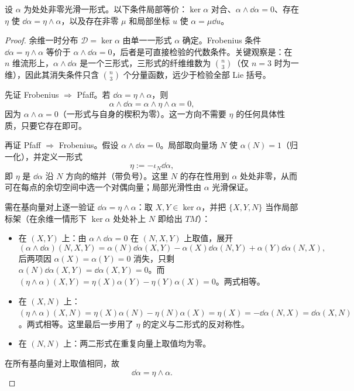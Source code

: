 \begin{proposition}
设 $\alpha$ 为处处非零光滑一形式。以下条件局部等价：$\ker\alpha$ 对合、$\alpha\wedge\dd\alpha=0$、存在 $\eta$ 使 $\dd\alpha=\eta\wedge\alpha$，以及存在非零 $\mu$ 和局部坐标 $u$ 使 $\alpha=\mu\dd u$。
\end{proposition}

\begin{proof}
余维一时分布 $\mathcal D=\ker\alpha$ 由单一一形式 $\alpha$ 确定。Frobenius 条件 $\dd\alpha=\eta\wedge\alpha$ 等价于 $\alpha\wedge\dd\alpha=0$，后者是可直接检验的代数条件。关键观察是：在 $n$ 维流形上，$\alpha\wedge\dd\alpha$ 是一个三形式，三形式的纤维维数为 $\binom n3$（仅 $n=3$ 时为一维），因此其消失条件只含 $\binom n3$ 个分量函数，远少于检验全部 Lie 括号。

先证 Frobenius $\Rightarrow$ Pfaff。若 $\dd\alpha=\eta\wedge\alpha$，则
\begin{equation*}
 \alpha\wedge\dd\alpha
 =\alpha\wedge\eta\wedge\alpha=0,
\end{equation*}
因为 $\alpha\wedge\alpha=0$（一形式与自身的楔积为零）。这一方向不需要 $\eta$ 的任何具体性质，只要它存在即可。

再证 Pfaff $\Rightarrow$ Frobenius。假设 $\alpha\wedge\dd\alpha=0$。局部取向量场 $N$ 使 $\alpha(N)=1$（归一化），并定义一形式
\begin{equation*}
 \eta:=-\iota_{N}\dd\alpha,
\end{equation*}
即 $\eta$ 是 $\dd\alpha$ 沿 $N$ 方向的缩并（带负号）。这里 $N$ 的存在性用到 $\alpha$ 处处非零，从而可在每点的余切空间中选一个对偶向量；局部光滑性由 $\alpha$ 光滑保证。

需在基向量对上逐一验证 $\dd\alpha=\eta\wedge\alpha$：取 $X,Y\in\ker\alpha$，并把 $\{X,Y,N\}$ 当作局部标架（在余维一情形下 $\ker\alpha$ 处处补上 $N$ 即给出 $TM$）：
\begin{itemize}
\item 在 $(X,Y)$ 上：由 $\alpha\wedge\dd\alpha=0$ 在 $(N,X,Y)$ 上取值，展开
\begin{equation*}
(\alpha\wedge\dd\alpha)(N,X,Y)
=\alpha(N)\dd\alpha(X,Y)-\alpha(X)\dd\alpha(N,Y)+\alpha(Y)\dd\alpha(N,X),
\end{equation*}
后两项因 $\alpha(X)=\alpha(Y)=0$ 消失，只剩 $\alpha(N)\dd\alpha(X,Y)=\dd\alpha(X,Y)=0$。而 $(\eta\wedge\alpha)(X,Y)=\eta(X)\alpha(Y)-\eta(Y)\alpha(X)=0$。两式相等。
\item 在 $(X,N)$ 上：$(\eta\wedge\alpha)(X,N)=\eta(X)\alpha(N)-\eta(N)\alpha(X)=\eta(X)=-\dd\alpha(N,X)=\dd\alpha(X,N)$。两式相等。这里最后一步用了 $\eta$ 的定义与二形式的反对称性。
\item 在 $(N,N)$ 上：两二形式在重复向量上取值均为零。
\end{itemize}
在所有基向量对上取值相同，故
\begin{equation*}
 \dd\alpha=\eta\wedge\alpha.
\end{equation*}


\end{proof}
